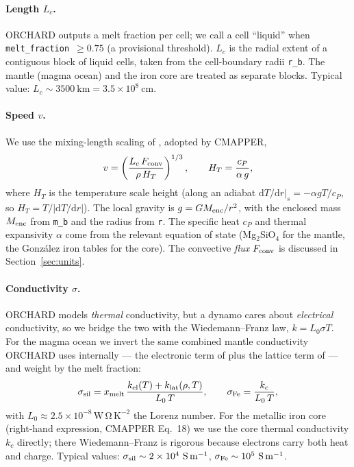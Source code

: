 \documentclass{aastex631}
\newcommand{\code}[1]{\texttt{#1}}
\newcommand{\Lc}{L_c}
\newcommand{\Cp}{c_P}
\newcommand{\HT}{H_T}
\newcommand{\Fconv}{F_{\rm conv}}
\begin{document}
\paragraph{Length $\Lc$.}  ORCHARD outputs a melt fraction per cell; we call a cell
``liquid'' when \code{melt\_fraction}~$\geq 0.75$ (a provisional threshold).  $\Lc$ is
the radial extent of a contiguous block of liquid cells, taken from the cell-boundary
radii \code{r\_b}.  The mantle (magma ocean) and the iron core are treated as separate
blocks.  Typical value: $\Lc\sim3500~\mathrm{km}=3.5\times10^{8}~\mathrm{cm}$.

\paragraph{Speed $v$.}  We use the mixing-length scaling of \citet{Christensen2010},
adopted by CMAPPER,
\begin{equation}
  v = \left(\frac{\Lc\,\Fconv}{\rho\,\HT}\right)^{1/3},
  \qquad
  \HT = \frac{\Cp}{\alpha\,g} ,
  \label{eq:v}
\end{equation}
where $\HT$ is the temperature scale height (along an adiabat
$\mathrm{d}T/\mathrm{d}r|_s=-\alpha g T/\Cp$, so $\HT=T/|\mathrm{d}T/\mathrm{d}r|$).
The local gravity is $g=GM_{\rm enc}/r^2$, with the enclosed mass $M_{\rm enc}$ from
\code{m\_b} and the radius from \code{r}.  The specific heat $\Cp$ and thermal
expansivity $\alpha$ come from the relevant equation of state (Mg$_2$SiO$_4$ for the
mantle, the Gonz\'alez iron tables for the core).  The convective \emph{flux} $\Fconv$
is discussed in Section~\ref{sec:units}.

\paragraph{Conductivity $\sigma$.}  ORCHARD models \emph{thermal} conductivity, but a
dynamo cares about \emph{electrical} conductivity, so we bridge the two with the
Wiedemann--Franz law, $k=L_0\sigma T$.  For the magma ocean we invert the same combined
mantle conductivity ORCHARD uses internally --- the electronic term of
\citet{Stamenkovic2011} plus the lattice term of \citet{PengDeng2025} --- and weight by
the melt fraction:
\begin{equation}
  \sigma_{\rm sil} = x_{\rm melt}\,
  \frac{k_{\rm el}(T) + k_{\rm lat}(\rho,T)}{L_0\,T} ,
  \qquad
  \sigma_{\rm Fe} = \frac{k_c}{L_0\,T} ,
  \label{eq:sigma}
\end{equation}
with $L_0\approx2.5\times10^{-8}\,\mathrm{W\,\Omega\,K^{-2}}$ the Lorenz number.  For
the metallic iron core (right-hand expression, CMAPPER Eq.~18) we use the core thermal
conductivity $k_c$ directly; there Wiedemann--Franz is rigorous because electrons carry
both heat and charge.  Typical values: $\sigma_{\rm sil}\sim2\times10^4~\mathrm{S\,m^{-1}}$,
$\sigma_{\rm Fe}\sim10^5~\mathrm{S\,m^{-1}}$.
\end{document}
